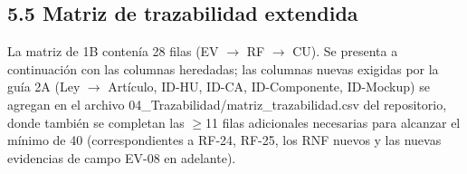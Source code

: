 \subsection*{5.5 Matriz de trazabilidad extendida}


La matriz de 1B contenía 28 filas (EV $\rightarrow$ RF $\rightarrow$ CU). Se presenta a continuación con las columnas heredadas; las columnas nuevas exigidas por la guía 2A (Ley $\rightarrow$ Artículo, ID-HU, ID-CA, ID-Componente, ID-Mockup) se agregan en el archivo 04\_Trazabilidad/matriz\_trazabilidad.csv del repositorio, donde también se completan las $\geq$11 filas adicionales necesarias para alcanzar el mínimo de 40 (correspondientes a RF-24, RF-25, los RNF nuevos y las nuevas evidencias de campo EV-08 en adelante).


